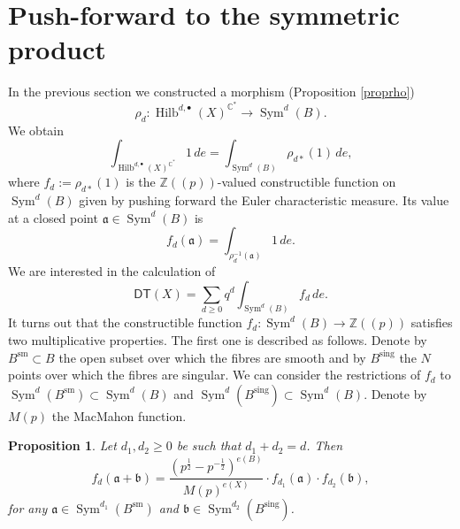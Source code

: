 \documentclass{amsart}
\newtheorem{proposition}[theorem]{Proposition}
\theoremstyle{definition}
\newcommand{\CC} {\mathbb{C}}          %
\newcommand{\ZZ} {\mathbb{Z}}		%
\newcommand{\Sym}{\operatorname{Sym}}
\newcommand{\Hilb}{\operatorname{Hilb}}
\newcommand{\DT}{\mathsf{DT}}
\newcommand{\sm}{\operatorname{sm}}
\newcommand{\sing}{\operatorname{sing}}
\newcommand{\DThat}{\widehat{\DT}}
\begin{document}


\section{Push-forward to the symmetric product} \label{sym}

In the previous section we constructed a morphism (Proposition \ref{proprho}) 
\begin{equation} \label{rho}
\rho_{d} : \Hilb^{d,\bullet}(X)^{\CC^*} \longrightarrow \Sym^d(B).
\end{equation}
We obtain
$$
\int_{\Hilb^{d,\bullet}(X)^{\CC^*}} 1 \, de = \int_{\Sym^d(B)} \rho_{d*}(1) \, de,
$$
where $f_d:= \rho_{d*}(1)$ is the $\ZZ ((p))$-valued constructible function on
$\Sym^d(B)$ given by pushing forward the Euler characteristic
measure.  Its value at a closed point
$\mathfrak{a} \in \Sym^d(B)$ is
$$
f_d(\mathfrak{a}) = \int_{\rho_{d}^{-1}(\mathfrak{a})} 1 \, de.
$$
We are interested in the calculation of
$$
\DThat (X) = \sum_{d \geq 0} q^d \int_{\Sym^d(B)} f_d \, de.
$$
It turns out that the constructible function $f_d : \Sym^d(B) \rightarrow \ZZ(\!(p)\!)$ satisfies two multiplicative properties. The first one is described as follows. Denote by $B^{\sm} \subset B$ the open subset over which the fibres are smooth and by $B^{\sing}$ the $N$ points over which the fibres are singular. We can consider the restrictions of $f_d$ to $\Sym^d(B^{\sm}) \subset \Sym^d(B)$ and $\Sym^d(B^{\sing}) \subset \Sym^d(B)$. Denote by $M(p)$ the MacMahon function.
\begin{proposition} \label{mult1}
Let $d_1, d_2 \geq 0$ be such that $d_1+d_2 = d$. Then 
$$ 
f_d(\mathfrak{a} + \mathfrak{b}) =\frac{(p^{\frac{1}{2}} - p^{-\frac{1}{2}})^{e(B)}}{M(p)^{e(X)}} \cdot f_{d_1}(\mathfrak{a}) \cdot f_{d_2}(\mathfrak{b}), 
$$
for any $\mathfrak{a} \in \Sym^{d_1}(B^{\sm})$ and $\mathfrak{b} \in \Sym^{d_2}(B^{\sing})$. 
\end{proposition}
\end{document}
